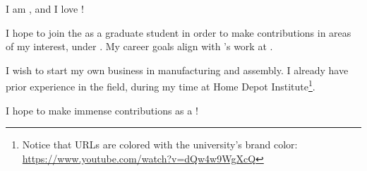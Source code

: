I am \myFullName, and I love \schoolShort!




I hope to join the \depta as a graduate student in order to make contributions in areas of my interest, under \drsm. My career goals align with \drm's work at \smlab.

I wish to start my own business in manufacturing and assembly. I already have prior experience in the field, during my time at Home Depot Institute\footnote{Notice that URLs are colored with the university's brand color: \url{https://www.youtube.com/watch?v=dQw4w9WgXcQ}}.



I hope to make immense contributions as a \student!

